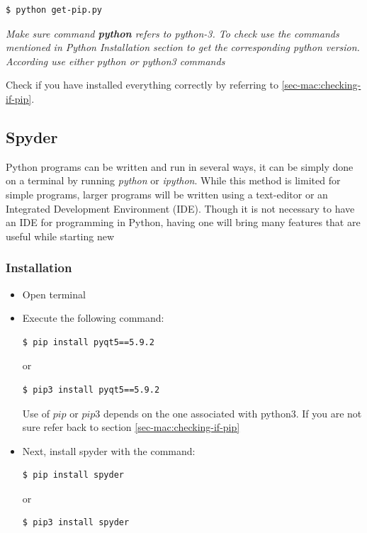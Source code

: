 \documentclass{cmc}
\begin{document}
\begin{lstlisting}[language=bash]
$ python get-pip.py
\end{lstlisting}

\textbf{}\textit{Make sure command \textbf{python}
  refers to python-3. To check use the commands mentioned in Python
  Installation section to get the corresponding python version.
  According use either python or python3 commands}

Check if you have installed everything correctly by referring to
\ref{sec-mac:checking-if-pip}.

\subsection{Spyder}
\label{sec-mac:spyder}

Python programs can be written and run in several ways, it can be
simply done on a terminal by running \textit{python} or
\textit{ipython}. While this method is limited for simple programs,
larger programs will be written using a text-editor or an Integrated
Development Environment (IDE). Though it is not necessary to have an
IDE for programming in Python, having one will bring many features
that are useful while starting new

\subsubsection{Installation}
\label{sec-win:installation-spyder}

\begin{itemize}
\item Open terminal
\item Execute the following command:
\begin{lstlisting}[language=bash]
$ pip install pyqt5==5.9.2
\end{lstlisting}
  or
\begin{lstlisting}[language=bash]
$ pip3 install pyqt5==5.9.2
\end{lstlisting}
  Use of $pip$ or $pip3$ depends on the one associated with python3.
  If you are not sure refer back to section
  \ref{sec-mac:checking-if-pip}
\item Next, install spyder with the command:
\begin{lstlisting}[language=bash]
$ pip install spyder
\end{lstlisting}
  or
\begin{lstlisting}[language=bash]
$ pip3 install spyder
\end{lstlisting}
\end{itemize}
\end{document}
